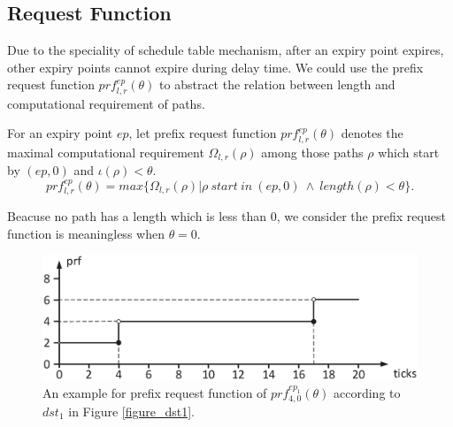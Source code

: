 \documentclass[sigconf]{acmart}
\begin{document}
\subsection{Request Function}\label{section_prf}
Due to the speciality of schedule table mechanism, after an expiry point expires, other expiry points cannot expire during delay time. We could use the prefix request function \cite{DBLP:journals/rts/Stigge015a} $prf^{ep}_{l,r}(\theta)$ to abstract the relation between length and computational requirement of paths.
\begin{definition}
For an expiry point $ep$, let prefix request function $prf^{ep}_{l,r}(\theta)$ denotes the maximal computational requirement $\Omega_{l,r}(\rho)$ among those paths $\rho$ which start by $(ep,0)$ and $\iota(\rho)<\theta$.
\begin{equation}
prf^{ep}_{l,r}(\theta)=max\{\Omega_{l,r}(\rho)|\rho \ start\ in\ (ep,0)\ \wedge\ length(\rho)<\theta\}.
\end{equation}\label{equation_prf}
\end{definition}

Beacuse no path has a length which is less than 0, we consider the prefix request function is meaningless when $\theta=0$.


\begin{figure}[t]
  \centering
  \includegraphics[scale=0.32]{graphics/figure_prf.eps}
  \caption{An example for prefix request function of $prf^{ep_1}_{4,0}(\theta)$ according to $dst_1$ in Figure \ref{figure_dst1}.} 
  \label{figure_prf}
\end{figure}
\end{document}
